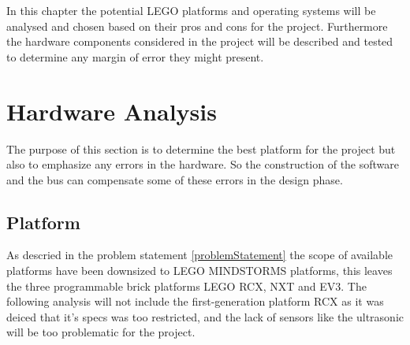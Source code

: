 In this chapter the potential LEGO platforms and operating systems will be analysed and chosen based on their pros and cons for the project. Furthermore the hardware components considered in the project will be described and tested to determine any margin of error they might present.  






\section{Hardware Analysis}
The purpose of this section is to determine the best platform for the project but also to emphasize any errors in the hardware. So the construction of the software and the bus can compensate some of these errors in the design phase. 





\subsection{Platform}
As descried in the problem statement \ref{problemStatement} the scope of available platforms have been downsized to LEGO MINDSTORMS platforms, this leaves the three programmable brick platforms LEGO RCX, NXT and EV3\cite{legoRoboticsHistory}. The following analysis will not include the first-generation platform RCX as it was deiced that it's specs was too restricted, and the lack of sensors like the ultrasonic will be too problematic for the project.

